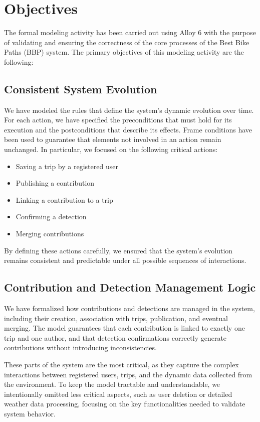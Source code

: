 \section{Objectives}
The formal modeling activity has been carried out using Alloy 6 with the purpose of validating and ensuring the correctness of the core processes of the Best Bike Paths (BBP) system. The primary objectives of this modeling activity are the following:

\subsection{Consistent System Evolution}
We have modeled the rules that define the system's dynamic evolution over time. For each action, we have specified the preconditions that must hold for its execution and the postconditions that describe its effects. Frame conditions have been used to guarantee that elements not involved in an action remain unchanged. In particular, we focused on the following critical actions:
\begin{itemize}
    \item Saving a trip by a registered user
    \item Publishing a contribution
    \item Linking a contribution to a trip
    \item Confirming a detection
    \item Merging contributions
\end{itemize}
By defining these actions carefully, we ensured that the system’s evolution remains consistent and predictable under all possible sequences of interactions.

\subsection{Contribution and Detection Management Logic}
We have formalized how contributions and detections are managed in the system, including their creation, association with trips, publication, and eventual merging. The model guarantees that each contribution is linked to exactly one trip and one author, and that detection confirmations correctly generate contributions without introducing inconsistencies.

These parts of the system are the most critical, as they capture the complex interactions between registered users, trips, and the dynamic data collected from the environment. To keep the model tractable and understandable, we intentionally omitted less critical aspects, such as user deletion or detailed weather data processing, focusing on the key functionalities needed to validate system behavior. 

